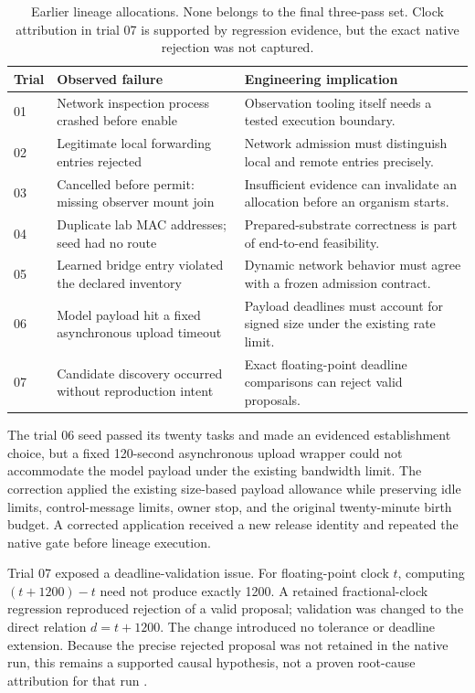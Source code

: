 \documentclass[11pt,letterpaper]{article}
\begin{document}
\begin{table}[htbp]
\centering\small
\caption{Earlier lineage allocations. None belongs to the final three-pass set.
Clock attribution in trial 07 is supported by regression evidence, but the exact
native rejection was not captured.}
\label{tab:failures}
\begin{tabular}{@{}lp{}p{}@{}}
\toprule
Trial & Observed failure & Engineering implication\\
\midrule
01 & Network inspection process crashed before enable &
Observation tooling itself needs a tested execution boundary.\\
02 & Legitimate local forwarding entries rejected &
Network admission must distinguish local and remote entries precisely.\\
03 & Cancelled before permit: missing observer mount join &
Insufficient evidence can invalidate an allocation before an organism starts.\\
04 & Duplicate lab MAC addresses; seed had no route &
Prepared-substrate correctness is part of end-to-end feasibility.\\
05 & Learned bridge entry violated the declared inventory &
Dynamic network behavior must agree with a frozen admission contract.\\
06 & Model payload hit a fixed asynchronous upload timeout &
Payload deadlines must account for signed size under the existing rate limit.\\
07 & Candidate discovery occurred without reproduction intent &
Exact floating-point deadline comparisons can reject valid proposals.\\
\bottomrule
\end{tabular}
\end{table}

The trial 06 seed passed its twenty tasks and made an evidenced establishment
choice, but a fixed 120-second asynchronous upload wrapper could not accommodate
the model payload under the existing bandwidth limit. The correction applied
the existing size-based payload allowance while preserving idle limits,
control-message limits, owner stop, and the original twenty-minute birth
budget. A corrected application received a new release identity and repeated
the native gate before lineage execution.

Trial 07 exposed a deadline-validation issue. For floating-point clock $t$,
computing $(t+1200)-t$ need not produce exactly 1200. A retained fractional-clock
regression reproduced rejection of a valid proposal; validation was changed
to the direct relation $d=t+1200$. The change introduced no tolerance or
deadline extension. Because the precise rejected proposal was not retained in
the native run, this remains a supported causal hypothesis, not a proven
root-cause attribution for that run \cite{failures,reduced}.
\end{document}
